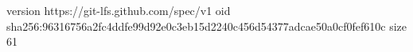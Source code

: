 version https://git-lfs.github.com/spec/v1
oid sha256:96316756a2fc4ddfe99d92e0c3eb15d2240c456d54377adcae50a0cf0fef610c
size 61
